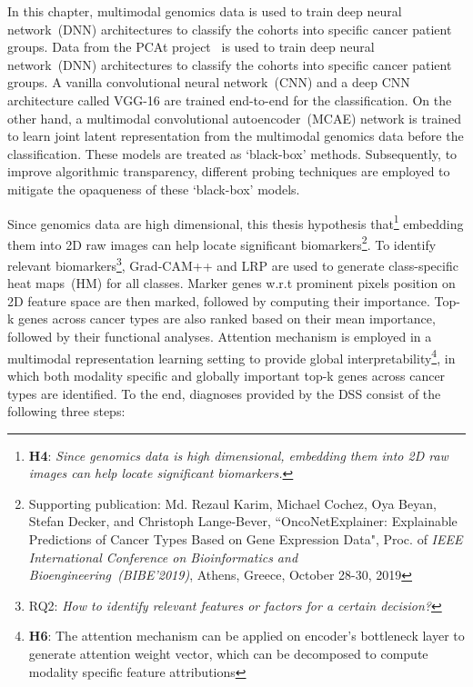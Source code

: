 \hspace*{3.5mm} In this chapter, multimodal genomics data is used to train deep neural network~(DNN) architectures to classify the cohorts into specific cancer patient groups. Data from the PCAt project~\cite{weinstein2013cancer} is used to train deep neural network~(DNN) architectures to classify the cohorts into specific cancer patient groups. A vanilla convolutional neural network~(CNN) and a deep CNN architecture called VGG-16 are trained end-to-end for the classification. On the other hand, a multimodal convolutional autoencoder~(MCAE) network is trained to learn joint latent representation from the multimodal genomics data before the classification. These models are treated as `black-box' methods. Subsequently, to improve algorithmic transparency, different probing techniques are employed to mitigate the opaqueness of these `black-box' models. 

\hspace*{3.5mm} Since genomics data are high dimensional, this thesis hypothesis that\footnote{\textbf{H4}: \textit{Since genomics data is high dimensional, embedding them into 2D raw images can help locate significant biomarkers.}} embedding them into 2D raw images can help locate significant biomarkers\footnote{Supporting publication: Md. Rezaul Karim, Michael Cochez, Oya Beyan, Stefan Decker, and Christoph Lange-Bever, ``OncoNetExplainer: Explainable Predictions of Cancer Types Based on Gene Expression Data", Proc. of \emph{IEEE International Conference on Bioinformatics and Bioengineering~(BIBE'2019)}, Athens, Greece, October 28-30, 2019}. %
To identify relevant biomarkers\footnote{RQ2: \textit{How to identify relevant features or factors for a certain decision?}}, Grad-CAM++ and LRP are used to generate class-specific heat maps~(HM) for all classes. 
Marker genes w.r.t prominent pixels position on 2D feature space are then marked, followed by computing their importance. Top-k genes across cancer types are also ranked based on their mean importance, followed by their functional analyses.  
Attention mechanism is employed in a multimodal representation learning setting to provide global interpretability\footnote{\textbf{H6}: The attention mechanism can be applied on encoder's bottleneck layer to generate attention weight vector, which can be decomposed to compute modality specific feature attributions}, in which both modality specific and globally important top-k genes across cancer types are identified. To the end, diagnoses provided by the DSS consist of the following three steps: 

